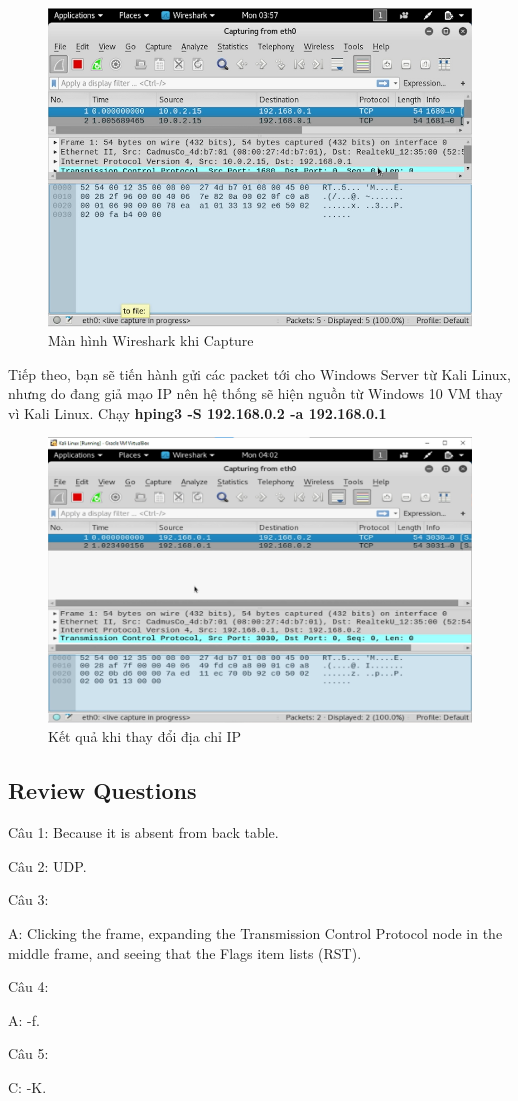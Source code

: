 \begin{figure}[!htb]
    \centering
    \includegraphics[width=0.8\linewidth]{figure//chapter5//lab5_2/capture_wireshark.png}
    \caption{Màn hình Wireshark khi Capture}
    \label{fig:enter-label}
\end{figure}

 Tiếp theo, bạn sẽ tiến hành gửi các packet tới cho Windows Server từ Kali Linux, nhưng do đang giả mạo IP nên hệ thống sẽ hiện nguồn từ Windows 10 VM thay vì Kali Linux. Chạy \textbf{hping3 -S 192.168.0.2 -a 192.168.0.1}

\begin{figure}[!htb]
    \centering
    \includegraphics[width=0.8\linewidth]{figure//chapter5//lab5_2/spoof.png}
    \caption{Kết quả khi thay đổi địa chỉ IP}
    \label{fig:enter-label}
\end{figure}

\subsection{Review Questions}

\noindent Câu 1: Because it is absent from back table.

\noindent Câu 2: UDP.

\noindent Câu 3: 

A: Clicking the frame, expanding the Transmission Control Protocol node in the middle frame, and seeing that the Flags item lists (RST).

\noindent Câu 4:

A: -f.

\noindent Câu 5:

C: -K.

